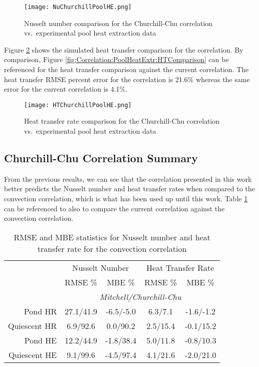 \begin{figure}
	\centering
	\texttt{[image: NuChurchillPoolHE.png]}
	\caption{Nusselt number comparison for the Churchill-Chu correlation vs.\ experimental pool heat extraction data}
	\label{fig:Correlation:Churchill:NuPoolHE}
\end{figure}

Figure \ref{fig:Correlation:Churchill:HTPoolHE} shows the simulated heat transfer comparison for the \cite{ChurchillChu1975} correlation. By comparison, Figure \ref{fig:Correlation:PoolHeatExtr:HTComparison} can be referenced for the heat transfer comparison against the current correlation. The heat transfer RMSE percent error for the \cite{ChurchillChu1975} correlation is 21.6\% whereas the same error for the current correlation is 4.1\%.

\begin{figure}
	\centering
	\texttt{[image: HTChurchillPoolHE.png]}
	\caption{Heat transfer rate comparison for the Churchill-Chu correlation vs.\ experimental pool heat extraction data}
	\label{fig:Correlation:Churchill:HTPoolHE}
\end{figure}

\subsection{Churchill-Chu Correlation Summary}
\label{Correlation:Churchill:Summary}

From the previous results, we can see that the correlation presented in this work better predicts the Nusselt number and heat transfer rates when compared to the \cite{ChurchillChu1975} convection correlation, which is what has been used up until this work. Table \ref{tab:Correlation:Churchill:SummaryTable} can be referenced to also to compare the current correlation against the \cite{ChurchillChu1975} convection correlation.

\begin{table}[h]
	\centering
	\caption{RMSE and MBE statistics for Nusselt number and heat transfer rate for the \cite{ChurchillChu1975} convection correlation}
	\label{tab:Correlation:Churchill:SummaryTable}
	\begin{tabular}{r | c c c c}
	\hline
	& \multicolumn{2}{c}{Nusselt Number} & \multicolumn{2}{c}{Heat Transfer Rate} \\
	& RMSE \% & MBE \% & RMSE \% & MBE \% \\
	\hline
	& \multicolumn{4}{c}{\textit{Mitchell/Churchill-Chu}} \\
	\hline\hline
	Pond HR & 27.1/41.9 & -6.5/-5.0 & 6.3/7.1 & -1.6/-1.2 \\
	\hline
	Quiescent HR & 6.9/92.6 & 0.0/90.2 & 2.5/15.4 & -0.1/15.2 \\
	\hline
	Pond HE & 12.2/44.9 & -1.8/38.4 & 5.0/11.8 & -0.8/10.3 \\
	\hline
	Quiescent HE & 9.1/99.6 & -4.5/97.4 & 4.1/21.6 & -2.0/21.0 \\
	\hline
	\end{tabular}
\end{table}

